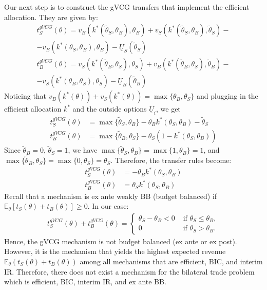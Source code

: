 \documentclass[a4paper]{article}
\begin{document}
Our next step is to construct the gVCG transfers that implement the efficient allocation. They are given by:
\begin{align*}
	t_S^{gVCG}(\theta) = v_B(k^*(\tilde{\theta}_S,\theta_B),\theta_B) + v_S(k^*(\tilde{\theta}_S,\theta_B),\tilde{\theta}_S) - \\
	-v_B(k^*(\theta_S,\theta_B),\theta_B) - \underline{U}_S(\tilde{\theta}_S)
	\\
	t_B^{gVCG}(\theta) = v_S(k^*(\tilde{\theta}_B,\theta_S),\theta_S) + v_B(k^*(\tilde{\theta}_B,\theta_S),\tilde{\theta}_B) - \\
	-v_S(k^*(\theta_B,\theta_S),\theta_S) - \underline{U}_B(\tilde{\theta}_B)
\end{align*}
Noticing that $v_B(k^*(\theta))+v_S(k^*(\theta)) = \max \{\theta_B,\theta_S\}$ and plugging in the efficient allocation $k^*$ and the outside options $\underline{U}_i$, we get
\begin{align*}
	t_S^{gVCG}(\theta) &= \max\{\tilde{\theta}_S,\theta_B\} - \theta_B k^*(\theta_S,\theta_B) - \tilde{\theta}_S
	\\
	t_B^{gVCG}(\theta) &= \max\{\tilde{\theta}_B,\theta_S\} - \theta_S \left(1 - k^*(\theta_S,\theta_B)\right)
\end{align*}
Since $\tilde{\theta}_B = 0$, $\tilde{\theta}_S = 1$, we have $\max\{\tilde{\theta}_S,\theta_B\} = \max\{1,\theta_B\} = 1$, and $\max\{\tilde{\theta}_B,\theta_S\} = \max\{0,\theta_S\} = \theta_S$. Therefore, the transfer rules become:
\begin{align*}
	t_S^{gVCG}(\theta) &= - \theta_B k^*(\theta_S,\theta_B)
	\\
	t_B^{gVCG}(\theta) &= \theta_S k^*(\theta_S,\theta_B)
\end{align*}
Recall that a mechanism is ex ante weakly BB (budget balanced) if $\mathbb{E}_\theta \left[ t_S(\theta)+t_B(\theta) \right] \geq 0$. In our case:
\begin{align*}
	t_S^{gVCG}(\theta)+t_B^{gVCG}(\theta)= \begin{cases}
		\theta_S - \theta_B <0 & \text{ if } \theta_S \leq \theta_B, 
		\\ 
		0 & \text{ if } \theta_S > \theta_B.
	\end{cases}
\end{align*}
Hence, the gVCG mechanism is not budget balanced (ex ante or ex post). However, it is the mechanism that yields the highest expected revenue $\mathbb{E}_\theta \left(t_S(\theta) + t_B(\theta)\right)$ among all mechanisms that are efficient, BIC, and interim IR. Therefore, there does not exist a mechanism for the bilateral trade problem which is efficient, BIC, interim IR, and ex ante BB.
\end{document}
